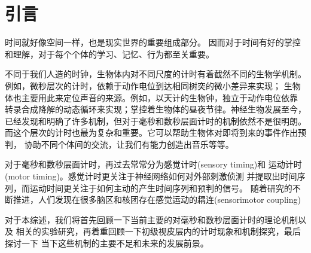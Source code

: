 \section{引言}

时间就好像空间一样，也是现实世界的重要组成部分。
因而对于时间有好的掌控和理解，对于每个个体的学习、记忆、行为都至关重要。

不同于我们人造的时钟，生物体内对不同尺度的计时有着截然不同的生物学机制。
例如，微秒层次的计时，依赖于动作电位到达相同树突的微小差异来实现；
生物体也主要用此来定位声音的来源。例如，以天计的生物钟，独立于动作电位依靠
转录合成降解的动态循环来实现；掌控着生物体的昼夜节律。神经生物发展至今，
已经发现和明确了许多机制，但对于毫秒和数秒层面计时的机制依然不是很明朗。
而这个层次的计时也最为复杂和重要。它可以帮助生物体对即将到来的事件作出预判，
协助不同个体间的交流，让我们有能力创造出音乐等等。

对于毫秒和数秒层面计时，再过去常常分为感觉计时(sensory timing)和
运动计时(motor timing)。感觉计时更关注于神经网络如何对外部刺激侦测
并提取出时间序列，而运动时间更关注于如何主动的产生时间序列和预判的信号。
随着研究的不断推进，人们发现在很多脑区和核团存在感觉运动的耦连(sensorimotor coupling)


对于本综述，我们将首先回顾一下当前主要的对毫秒和数秒层面计时的理论机制以及
相关的实验研究，再着重回顾一下初级视皮层内的计时现象和机制探究，最后探讨一下
当下这些机制的主要不足和未来的发展前景。
